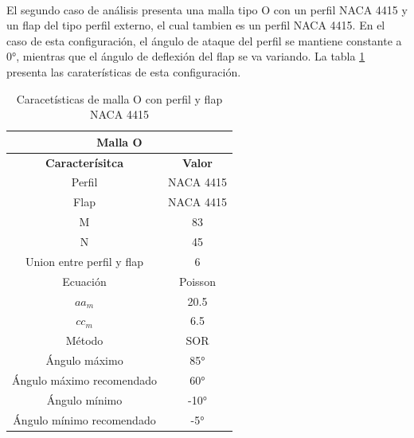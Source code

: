 \documentclass[letterpaper, openright, 12pt]{book}
\begin{document}
    \paragraph*{}
        El segundo caso de análisis presenta una malla tipo O con un perfil
        NACA 4415 y un flap del tipo perfil externo, el cual tambien es un
        perfil NACA 4415. En el caso de esta configuración, el ángulo de ataque
        del perfil se mantiene constante a 0\si{\degree}, mientras que el ángulo
        de deflexión del flap se va variando. La tabla
        \ref{tabla_o_naca_4415_flap} presenta las  caraterísticas de esta
        configuración.

    \begin{table}[htbp!]
    \begin{center}
        \begin{tabular}{ | c | c |}
        \hline
        \multicolumn{2}{|c|}{Malla O}\\

        \hline
        \textbf{Caracterísitca} & \textbf{Valor} \\ \hline

        Perfil & NACA 4415
        \\ \hline

        Flap & NACA 4415
        \\ \hline

        M & 83
        \\ \hline

        N & 45
        \\ \hline

        Union entre perfil y flap & 6
        \\ \hline

        Ecuación & Poisson
        \\\hline

        $aa_m$ & 20.5
        \\ \hline

        $cc_m$ & 6.5
        \\ \hline

        Método & SOR
        \\\hline

        Ángulo máximo & 85\si{\degree}
        \\ \hline

        Ángulo máximo recomendado & 60\si{\degree}
        \\ \hline

        Ángulo mínimo & -10\si{\degree}
        \\ \hline

        Ángulo mínimo recomendado & -5\si{\degree}
        \\ \hline
        \end{tabular}
        \caption{Caracetísticas de malla O con perfil y flap NACA 4415}
    \label{tabla_o_naca_4415_flap}
    \end{center}
    \end{table}
\end{document}
